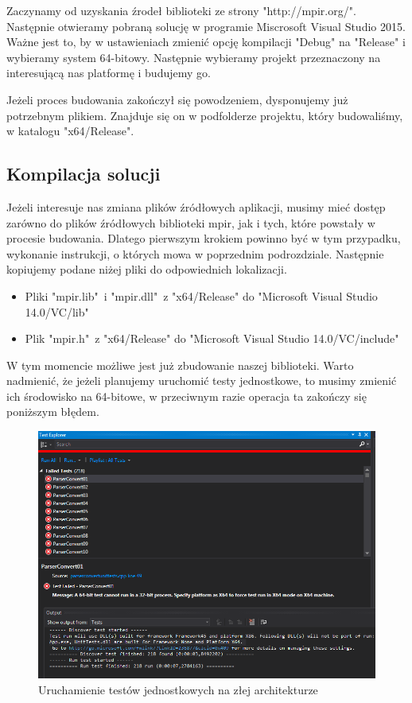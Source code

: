 Zaczynamy od uzyskania źrodeł biblioteki ze strony "http://mpir.org/". Następnie otwieramy pobraną solucję w programie Miscrosoft Visual Studio 2015. Ważne jest to, by w ustawieniach zmienić opcję kompilacji "Debug" na "Release" i wybieramy system 64-bitowy. Następnie wybieramy projekt przeznaczony na interesującą nas platformę i budujemy go.

Jeżeli proces budowania zakończył się powodzeniem, dysponujemy już potrzebnym plikiem. Znajduje się on w podfolderze projektu, który budowaliśmy, w katalogu "x64/Release".

\subsection{Kompilacja solucji}

Jeżeli interesuje nas zmiana plików źródłowych aplikacji, musimy mieć dostęp zarówno do plików źródłowych biblioteki mpir, jak i tych, które powstały w procesie budowania. Dlatego pierwszym krokiem powinno być w tym przypadku, wykonanie instrukcji, o których mowa w poprzednim podrozdziale. Następnie kopiujemy podane niżej pliki do odpowiednich lokalizacji.

\begin{itemize}
	\item Pliki "mpir.lib"\ i "mpir.dll"\ z "x64/Release" do "Microsoft Visual Studio 14.0/VC/lib"
	\item Plik "mpir.h"\ z "x64/Release" do "Microsoft Visual Studio 14.0/VC/include"
\end{itemize}

W tym momencie możliwe jest już zbudowanie naszej biblioteki. Warto nadmienić, że jeżeli planujemy uruchomić testy jednostkowe, to musimy zmienić ich środowisko na 64-bitowe, w przeciwnym razie operacja ta zakończy się poniższym błędem.

\begin{figure}[H]
	\includegraphics[width=15cm]{img/UnitTests_wrong_architecture.png}
	\caption{Uruchamienie testów jednostkowych na złej architekturze}
\end{figure}

